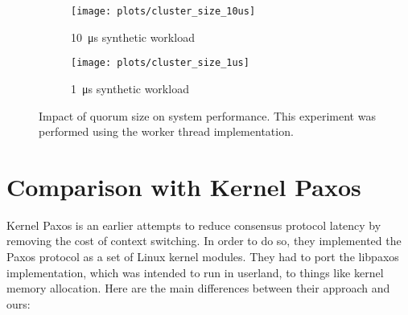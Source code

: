 \begin{figure}[p]
    \centering

    \begin{subfigure}[t]{0.8\textwidth}
        \texttt{[image: plots/cluster\_size\_10us]}
        \caption{\SI{10}{\micro\second} synthetic workload}
    \end{subfigure}

    \begin{subfigure}[t]{0.8\textwidth}
        \texttt{[image: plots/cluster\_size\_1us]}
        \caption{\SI{1}{\micro\second} synthetic workload}
    \end{subfigure}

    \caption{Impact of quorum size on system performance.
        This experiment was performed using the worker thread implementation.
    \label{fig:cluster-size}
    }
\end{figure}


% 
% 
% 


\section{Comparison with Kernel Paxos}

Kernel Paxos\cite{kernelpaxos} is an earlier attempts to reduce consensus protocol latency by removing the cost of context switching.
In order to do so, they implemented the Paxos protocol as a set of Linux kernel modules.
They had to port the libpaxos implementation, which was intended to run in userland, to things like kernel memory allocation.
Here are the main differences between their approach and ours:

